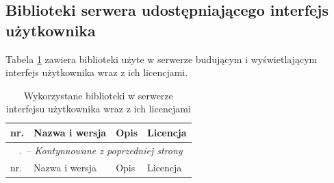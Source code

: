 \documentclass[a4paper,11pt,twoside]{report}
\renewcommand*{\thetable}{\arabic{chapter}.\arabic{table}}
\theoremstyle{definition}
\begin{document}
        \subsection{Biblioteki serwera udostępniającego interfejs użytkownika}
        Tabela \ref{biblioteki-frontend} zawiera biblioteki użyte w serwerze budującym i wyświetlającym interfejs użytkownika wraz z ich licencjami.
        
        \begin{longtable}{| p{} | p{} | p{} | p{} |}
            \caption{Wykorzystane biblioteki w serwerze interfejsu użytkownika wraz z ich licencjami}
            \label{biblioteki-frontend} \\
            \hline
            nr. & Nazwa i wersja & Opis & Licencja \\ \hline
            \endfirsthead
            \multicolumn{4}{c}{\tablename\ \thetable\ -- \textit{Kontynuowane z poprzedniej strony}} \\
            \hline
            nr. & Nazwa i wersja & Opis & Licencja \\ \hline
            \endhead
            

\end{longtable}
\end{document}
